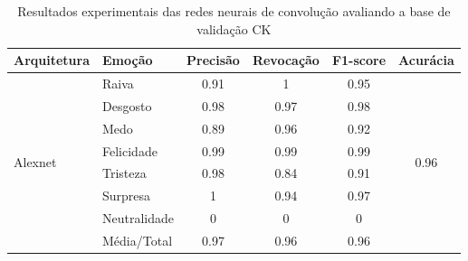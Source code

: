 \begin{table}[]
\centering
\caption{Resultados experimentais das redes neurais de convolução avaliando a base de validação CK}
\label{table:ck}
\begin{tabular}{llcccc}
\hline
\textbf{Arquitetura}                   & \textbf{Emoção}       & \multicolumn{1}{l}{\textbf{Precisão}} & \multicolumn{1}{l}{\textbf{Revocação}} & \multicolumn{1}{l}{\textbf{F1-score}} & \multicolumn{1}{l}{\textbf{Acurácia}} \\ \hline
\multirow{8}{*}{Alexnet}         & Raiva                 & 0.91                                  & 1                                      & 0.95                                  & \multirow{8}{*}{0.96}                 \\
                                       & Desgosto              & 0.98                                  & 0.97                                   & 0.98                                  &                                       \\
                                       & Medo                  & 0.89                                  & 0.96                                   & 0.92                                  &                                       \\
                                       & Felicidade            & 0.99                                  & 0.99                                   & 0.99                                  &                                       \\
                                       & Tristeza              & 0.98                                  & 0.84                                   & 0.91                                  &                                       \\
                                       & Surpresa              & 1                                     & 0.94                                   & 0.97                                  &                                       \\
                                       & Neutralidade          & 0                                     & 0                                      & 0                                     &                                       \\
                                       & Média/Total           & 0.97                                  & 0.96                                   & 0.96                                  &                                       \\ \hline

\end{tabular}
\end{table}
